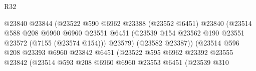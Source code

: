 \begin{lexlean}{R32}
\begin{coremodule}
                                              @23840
                                              @23844
                                              (@23522
                                                @590
                                                @6962
                                                @23388
                                                (@23552 @6451)
                                                @23840
                                                (@23514
                                                  @588
                                                  @208
                                                  @6960
                                                  @6960
                                                  @23551
                                                  @6451
                                                  (@23539
                                                    @154
                                                    @23562
                                                    @190
                                                    @23551
                                                    @23572
                                                    (@7155 (@23574 @154)))
                                                  @23579)
                                                (@23582 @23387))
                                              (@23514
                                                @596
                                                @208
                                                @23393
                                                @6960
                                                @23842
                                                @6451
                                                (@23522
                                                  @595
                                                  @6962
                                                  @23392
                                                  @23555
                                                  @23842
                                                  (@23514
                                                    @593
                                                    @208
                                                    @6960
                                                    @6960
                                                    @23553
                                                    @6451
                                                    (@23539
                                                      @310

\end{coremodule}
\end{lexlean}
